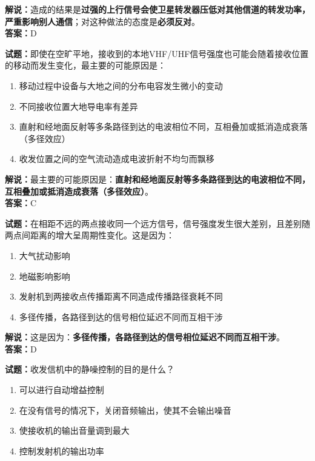 \documentclass{ctexbook}
\begin{document}
\noindent\textbf{解说：}造成的结果是\textbf{过强的上行信号会使卫星转发器压低对其他信道的转发功率，严重影响别人通信}；对这种做法的态度是\textbf{必须反对}。\\\noindent\textbf{答案：}D%

\bigskip


\noindent\textbf{试题：}即使在空旷平地，接收到的本地VHF/UHF信号强度也可能会随着接收位置的移动而发生变化，最主要的可能原因是：

\begin{enumerate}[leftmargin=3em]
	\item 移动过程中设备与大地之间的分布电容发生微小的变动
	\item 不同接收位置大地导电率有差异
	\item 直射和经地面反射等多条路径到达的电波相位不同，互相叠加或抵消造成衰落（多径效应）
	\item 收发位置之间的空气流动造成电波折射不均匀而飘移
\end{enumerate}

\noindent\textbf{解说：}最主要的可能原因是：\textbf{直射和经地面反射等多条路径到达的电波相位不同，互相叠加或抵消造成衰落（多径效应）}。\\\noindent\textbf{答案：}C%



\bigskip


\noindent\textbf{试题：}在相距不远的两点接收同一个远方信号，信号强度发生很大差别，且差别随两点间距离的增大呈周期性变化。这是因为：

\begin{enumerate}[leftmargin=3em]
	\item 大气扰动影响
	\item 地磁影响影响
	\item 发射机到两接收点传播距离不同造成传播路径衰耗不同
	\item 多径传播，各路径到达的信号相位延迟不同而互相干涉
\end{enumerate}

\noindent\textbf{解说：}这是因为：\textbf{多径传播，各路径到达的信号相位延迟不同而互相干涉}。\\\noindent\textbf{答案：}D%

\bigskip


\noindent\textbf{试题：}收发信机中的静噪控制的目的是什么？

\begin{enumerate}[leftmargin=3em]
	\item 可以进行自动增益控制
	\item 在没有信号的情况下，关闭音频输出，使其不会输出噪音%
	\item 使接收机的输出音量调到最大
	\item 控制发射机的输出功率
\end{enumerate}
\end{document}
